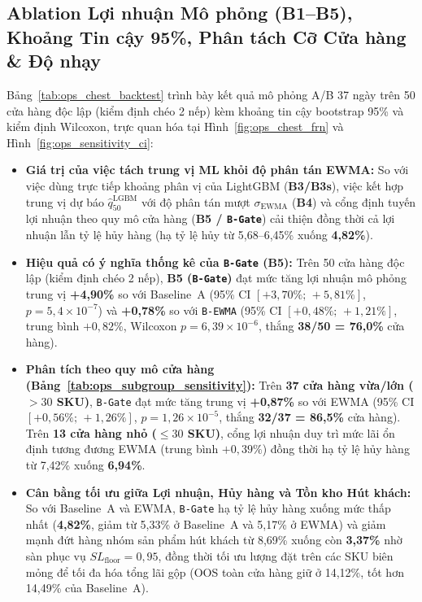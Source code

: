 \subsection*{Ablation Lợi nhuận Mô phỏng (B1--B5), Khoảng Tin cậy 95\%, Phân tách Cỡ Cửa hàng \& Độ nhạy}
Bảng~\ref{tab:ops_chest_backtest} trình bày kết quả mô phỏng A/B 37 ngày trên 50 cửa hàng độc lập (kiểm định chéo 2 nếp) kèm khoảng tin cậy bootstrap 95\% và kiểm định Wilcoxon, trực quan hóa tại Hình~\ref{fig:ops_chest_frn} và Hình~\ref{fig:ops_sensitivity_ci}:
\begin{itemize}
    \item \textbf{Giá trị của việc tách trung vị ML khỏi độ phân tán EWMA:} So với việc dùng trực tiếp khoảng phân vị của LightGBM (\textbf{B3/B3s}), việc kết hợp trung vị dự báo $\hat{q}_{50}^{\text{LGBM}}$ với độ phân tán mượt $\sigma_{\text{EWMA}}$ (\textbf{B4}) và cổng định tuyến lợi nhuận theo quy mô cửa hàng (\textbf{B5 / \texttt{B-Gate}}) cải thiện đồng thời cả lợi nhuận lẫn tỷ lệ hủy hàng (hạ tỷ lệ hủy từ 5,68--6,45\% xuống \textbf{4,82\%}).
    \item \textbf{Hiệu quả có ý nghĩa thống kê của \texttt{B-Gate} (B5):} Trên 50 cửa hàng độc lập (kiểm định chéo 2 nếp), \textbf{B5 (\texttt{B-Gate})} đạt mức tăng lợi nhuận mô phỏng trung vị \textbf{+4,90\%} so với Baseline~A (95\% CI $[+3{,}70\%;\,+5{,}81\%]$, $p = 5{,}4\times 10^{-7}$) và \textbf{+0,78\%} so với \texttt{B-EWMA} (95\% CI \textbf{$[+0{,}48\%;\,+1{,}21\%]$}, trung bình $+0{,}82\%$, Wilcoxon \textbf{$p = 6{,}39\times 10^{-6}$}, thắng \textbf{38/50 = 76,0\%} cửa hàng).
    \item \textbf{Phân tích theo quy mô cửa hàng (Bảng~\ref{tab:ops_subgroup_sensitivity}):} Trên \textbf{37 cửa hàng vừa/lớn ($>30$ SKU)}, \texttt{B-Gate} đạt mức tăng trung vị \textbf{+0,87\%} so với EWMA (95\% CI $[+0{,}56\%;\,+1{,}26\%]$, $p = 1{,}26\times 10^{-5}$, thắng \textbf{32/37 = 86,5\%} cửa hàng). Trên \textbf{13 cửa hàng nhỏ ($\le 30$ SKU)}, cổng lợi nhuận duy trì mức lãi ổn định tương đương EWMA (trung bình $+0{,}39\%$) đồng thời hạ tỷ lệ hủy hàng từ 7,42\% xuống \textbf{6,94\%}.
    \item \textbf{Cân bằng tối ưu giữa Lợi nhuận, Hủy hàng và Tồn kho Hút khách:} So với Baseline~A và EWMA, \texttt{B-Gate} hạ tỷ lệ hủy hàng xuống mức thấp nhất (\textbf{4,82\%}, giảm từ 5,33\% ở Baseline~A và 5,17\% ở EWMA) và giảm mạnh đứt hàng nhóm sản phẩm hút khách từ 8,69\% xuống còn \textbf{3,37\%} nhờ sàn phục vụ $SL_{\text{floor}} = 0{,}95$, đồng thời tối ưu lượng đặt trên các SKU biên mỏng để tối đa hóa tổng lãi gộp (OOS toàn cửa hàng giữ ở 14,12\%, tốt hơn 14,49\% của Baseline~A).

\end{itemize}
